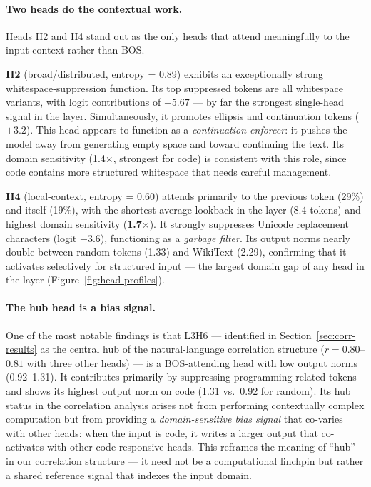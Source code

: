 \documentclass[11pt,a4paper]{article}
\begin{document}
\paragraph{Two heads do the contextual work.}
Heads H2 and H4 stand out as the only heads that attend meaningfully to the input context rather than BOS.

\textbf{H2} (broad/distributed, entropy = 0.89) exhibits an exceptionally strong whitespace-suppression function.
Its top suppressed tokens are all whitespace variants, with logit contributions of $-5.67$ --- by far the strongest single-head signal in the layer.
Simultaneously, it promotes ellipsis and continuation tokens ($+3.2$).
This head appears to function as a \emph{continuation enforcer}: it pushes the model away from generating empty space and toward continuing the text.
Its domain sensitivity (1.4$\times$, strongest for code) is consistent with this role, since code contains more structured whitespace that needs careful management.

\textbf{H4} (local-context, entropy = 0.60) attends primarily to the previous token (29\%) and itself (19\%), with the shortest average lookback in the layer (8.4 tokens) and highest domain sensitivity (\textbf{1.7$\times$}).
It strongly suppresses Unicode replacement characters (logit $-3.6$), functioning as a \emph{garbage filter}.
Its output norms nearly double between random tokens (1.33) and WikiText (2.29), confirming that it activates selectively for structured input --- the largest domain gap of any head in the layer (Figure~\ref{fig:head-profiles}).

\paragraph{The hub head is a bias signal.}
One of the most notable findings is that L3H6 --- identified in Section~\ref{sec:corr-results} as the central hub of the natural-language correlation structure ($r = 0.80$--$0.81$ with three other heads) --- is a BOS-attending head with low output norms (0.92--1.31).
It contributes primarily by suppressing programming-related tokens and shows its highest output norm on code (1.31 vs.\ 0.92 for random).
Its hub status in the correlation analysis arises not from performing contextually complex computation but from providing a \emph{domain-sensitive bias signal} that co-varies with other heads: when the input is code, it writes a larger output that co-activates with other code-responsive heads.
This reframes the meaning of ``hub'' in our correlation structure --- it need not be a computational linchpin but rather a shared reference signal that indexes the input domain.
\end{document}

